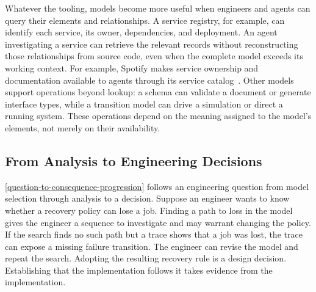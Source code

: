 
Whatever the tooling, models become more useful when engineers and agents can query their elements and relationships. A service registry, for example, can identify each service, its owner, dependencies, and deployment. An agent investigating a service can retrieve the relevant records without reconstructing those relationships from source code, even when the complete model exceeds its working context. For example, Spotify makes service ownership and documentation available to agents through its service catalog~\citep{spotify2026constraint}. Other models support operations beyond lookup: a schema can validate a document or generate interface types, while a transition model can drive a simulation or direct a running system. These operations depend on the meaning assigned to the model's elements, not merely on their availability.

\subsection{From Analysis to Engineering Decisions}\label{heading:from-analysis-to-engineering-decisions}



\autoref{question-to-consequence-progression} follows an engineering question from model selection through analysis to a decision. Suppose an engineer wants to know whether a recovery policy can lose a job. Finding a path to loss in the model gives the engineer a sequence to investigate and may warrant changing the policy. If the search finds no such path but a trace shows that a job was lost, the trace can expose a missing failure transition. The engineer can revise the model and repeat the search. Adopting the resulting recovery rule is a design decision. Establishing that the implementation follows it takes evidence from the implementation.

